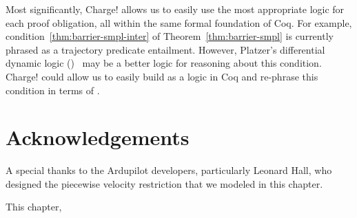 Most significantly, Charge! allows us to easily use the most appropriate
logic for each proof obligation, all within the same formal foundation of
Coq. For example, condition~\eqref{thm:barrier-smpl-inter} of
Theorem~\ref{thm:barrier-smpl} is currently phrased as a trajectory
predicate entailment. However, Platzer's differential dynamic logic
(\dL{})~\cite{Platzer15substitution} may be a better logic for reasoning
about this condition. Charge! could allow us to easily build \dL{} as a
logic in Coq and re-phrase this condition in terms of \dL{}.




\section{Acknowledgements}
A special thanks to the Ardupilot developers, particularly Leonard Hall,
who designed the piecewise velocity restriction that we modeled in this
chapter.

This chapter, \expsmplack{}
